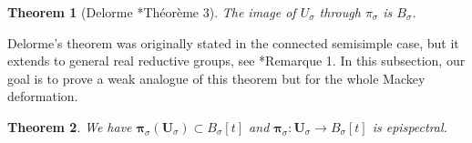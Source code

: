 \documentclass{amsart}
\newtheorem{theorem}{Theorem}[section]
\theoremstyle{definition}
\begin{document}
\begin{theorem}[Delorme \cite{Delorme84}*{Théorème 3}]\label{Delorme_theorem} The image of $U_\sigma$ through $\pi_\sigma$ is $B_\sigma$.
\end{theorem}

Delorme's theorem was originally stated in the connected semisimple case, but it extends to general real reductive groups, see \cite{DelormeAnnals}*{Remarque 1}. In this subsection, our goal is to prove a weak analogue of this theorem but for the whole Mackey deformation.

\begin{theorem}\label{epispectral}
    We have $\bm{\pi}_\sigma(\bm{U}_\sigma) \subset B_\sigma[t]$ and $\bm{\pi}_\sigma : \bm{U}_\sigma \to B_\sigma[t]$ is epispectral.
\end{theorem}
\end{document}

